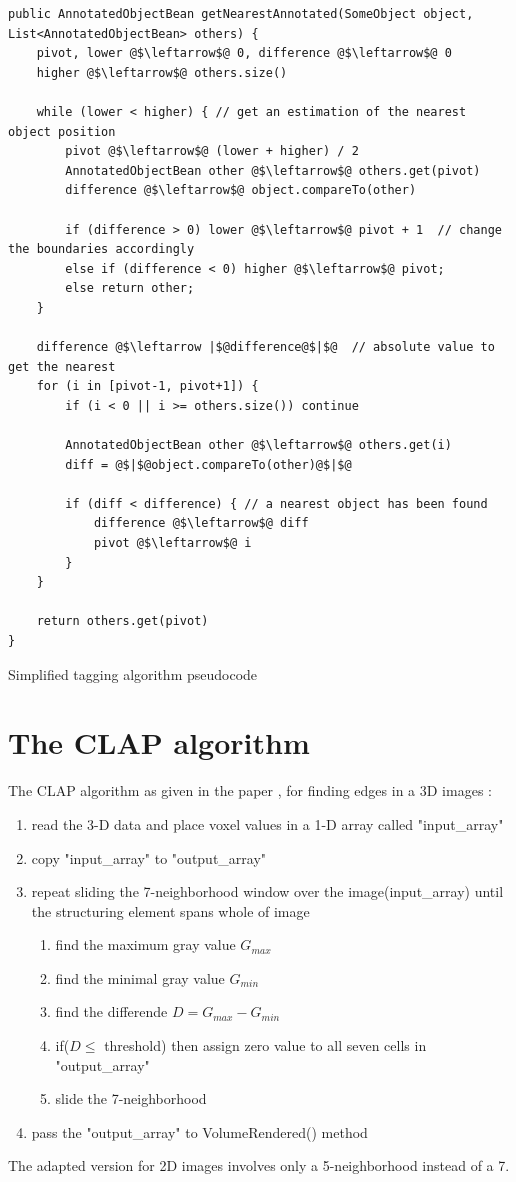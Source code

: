 \begin{listing}[H]
	\begin{verbatim}
public AnnotatedObjectBean getNearestAnnotated(SomeObject object, List<AnnotatedObjectBean> others) {
	pivot, lower @$\leftarrow$@ 0, difference @$\leftarrow$@ 0
	higher @$\leftarrow$@ others.size()
	
	while (lower < higher) { // get an estimation of the nearest object position 
		pivot @$\leftarrow$@ (lower + higher) / 2
		AnnotatedObjectBean other @$\leftarrow$@ others.get(pivot)
		difference @$\leftarrow$@ object.compareTo(other)
		
		if (difference > 0) lower @$\leftarrow$@ pivot + 1  // change the boundaries accordingly 
		else if (difference < 0) higher @$\leftarrow$@ pivot;
		else return other;
	}
	
	difference @$\leftarrow |$@difference@$|$@  // absolute value to get the nearest
	for (i in [pivot-1, pivot+1]) {
		if (i < 0 || i >= others.size()) continue
		
		AnnotatedObjectBean other @$\leftarrow$@ others.get(i)
		diff = @$|$@object.compareTo(other)@$|$@
		
		if (diff < difference) { // a nearest object has been found
			difference @$\leftarrow$@ diff
			pivot @$\leftarrow$@ i
		}
	}
	
	return others.get(pivot)	
}
	\end{verbatim}
	\caption{Simplified tagging algorithm pseudocode}
	\label{lst:simplified tagging algorithm}
\end{listing}




\section{The CLAP algorithm}
\label{sec:annexe:clap}

The \gls{CLAP} algorithm as given in the paper \cite{bib:filter:EdgeWithCLAP}, for finding edges in a 3D images : 
\begin{enumerate}
	\item read the 3-D data and place voxel values in a 1-D array called "input\_array"
	\item copy "input\_array" to "output\_array"
	\item repeat sliding the 7-neighborhood window over the image(input\_array) until the structuring element spans whole of image 
	\begin{enumerate}
		\item find the maximum gray value $G_{max}$
		\item find the minimal gray value $G_{min}$
		\item find the differende $D = G_{max} - G_{min}$
		\item if($D \leq $ threshold) then assign zero value to all seven cells in "output\_array" 
		\item slide the 7-neighborhood
	\end{enumerate}
	\item pass the "output\_array" to VolumeRendered() method 
\end{enumerate}

The adapted version for 2D images involves only a 5-neighborhood instead of a 7. 

